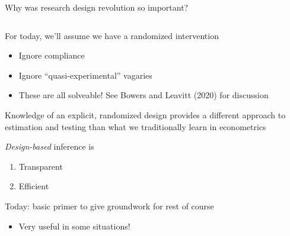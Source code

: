 \documentclass[notes,11pt, aspectratio=169]{beamer}
\newenvironment{wideitemize}{\itemize\addtolength{\itemsep}{10pt}}{\enditemize}
\begin{document}
\begin{frame}{Why was research design revolution so important?}
\begin{columns}[T] %
  \begin{column}{.7\textwidth}
    \begin{wideitemize}
    \item For today, we'll assume we have a randomized intervention
      \begin{itemize}
      \item Ignore compliance
      \item Ignore ``quasi-experimental'' vagaries
      \item These are all solveable! See Bowers and Leavitt (2020) for discussion
      \end{itemize}
    \item Knowledge of an explicit, randomized design provides a different
      approach to estimation and testing than what we traditionally learn in econometrics
    \item \emph{Design-based} inference is
      \begin{enumerate}
      \item Transparent
      \item Efficient
      \end{enumerate}
    \item Today: basic primer to give groundwork for rest of course
      \begin{itemize}
      \item Very useful in some situations!
      \end{itemize}
    \end{wideitemize}
\end{column}%
\hfill%
\begin{column}{.6\textwidth}
\end{column}%
\end{columns}
\end{frame}
\end{document}
